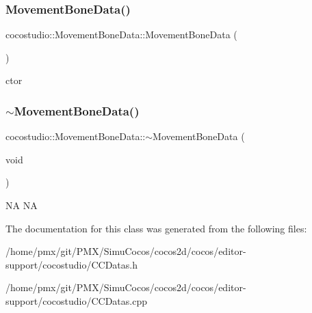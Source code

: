 \subsubsection{\texorpdfstring{Movement\+Bone\+Data()}{MovementBoneData()}\hspace{0.1cm}{\footnotesize\ttfamily [2/2]}}
{\footnotesize\ttfamily cocostudio\+::\+Movement\+Bone\+Data\+::\+Movement\+Bone\+Data (\begin{DoxyParamCaption}{ }\end{DoxyParamCaption})}

ctor \mbox{\label{classcocostudio_1_1MovementBoneData_a7b02d7bc0a1e8bc596cf4f94c70076aa}} 
\subsubsection{\texorpdfstring{$\sim$\+Movement\+Bone\+Data()}{~MovementBoneData()}\hspace{0.1cm}{\footnotesize\ttfamily [2/2]}}
{\footnotesize\ttfamily cocostudio\+::\+Movement\+Bone\+Data\+::$\sim$\+Movement\+Bone\+Data (\begin{DoxyParamCaption}\item[{void}]{ }\end{DoxyParamCaption})}

NA  NA 

The documentation for this class was generated from the following files\+:\begin{DoxyCompactItemize}
\item 
/home/pmx/git/\+P\+M\+X/\+Simu\+Cocos/cocos2d/cocos/editor-\/support/cocostudio/C\+C\+Datas.\+h\item 
/home/pmx/git/\+P\+M\+X/\+Simu\+Cocos/cocos2d/cocos/editor-\/support/cocostudio/C\+C\+Datas.\+cpp\end{DoxyCompactItemize}
